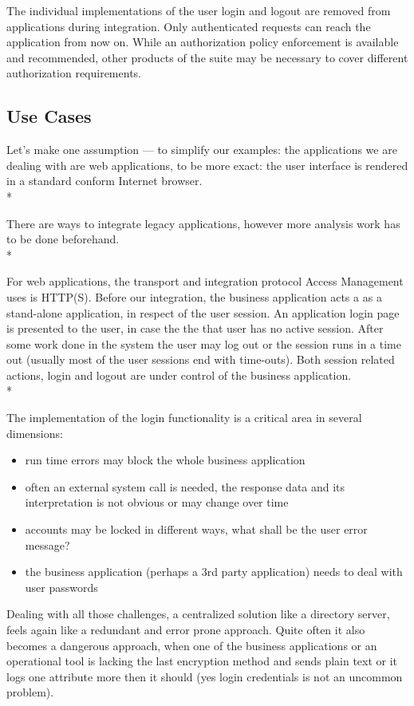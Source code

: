 The individual implementations of the user login and logout are removed
from applications during integration. Only authenticated requests can
reach the application from now on. While an authorization policy
enforcement is available and recommended, other products of the suite
may be necessary to cover different authorization requirements.


\subsection{Use Cases}

Let's make one assumption --- to simplify our examples: the applications
we are dealing with are web applications, to be more exact: the user
interface is rendered in a standard conform Internet browser.\\*

There are ways to integrate legacy applications, however more analysis
work has to be done beforehand.\\*

For web applications, the transport and integration protocol Access
Management uses is HTTP{(S)}. Before our integration, the business
application acts a as a stand-alone application, in respect of the user
session. An application login page is presented to the user, in case the
the that user has no active session. After some work done in the system
the user may log out or the session runs in a time out (usually most of
the user sessions end with time-outs). Both session related actions,
login and logout are under control of the business application.\\*

The implementation of the login functionality is a critical area in
several dimensions:

\begin{itemize}
    \item run time errors may block the whole business application
    \item often an external system call is needed, the response data 
        and its interpretation is not obvious or may change over time
    \item accounts may be locked in different ways, what shall be the 
        user error message?
    \item the business application (perhaps a 3rd party application) 
        needs to deal with user passwords
\end{itemize}

Dealing with all those challenges, a centralized solution like a
directory server, feels again like a redundant and error prone approach.
Quite often it also becomes a dangerous approach, when one of the
business applications or an operational tool is lacking the last
encryption method and sends plain text or it logs one attribute more
then it should (yes login credentials is not an uncommon problem).







